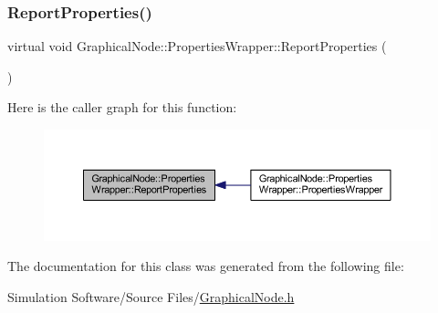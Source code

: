 \subsubsection{\texorpdfstring{Report\+Properties()}{ReportProperties()}}
{\footnotesize\ttfamily virtual void Graphical\+Node\+::\+Properties\+Wrapper\+::\+Report\+Properties (\begin{DoxyParamCaption}{ }\end{DoxyParamCaption})\hspace{0.3cm}{\ttfamily [pure virtual]}}

Here is the caller graph for this function\+:
\nopagebreak
\begin{figure}[H]
\begin{center}
\leavevmode
\includegraphics[width=350pt]{class_graphical_node_1_1_properties_wrapper_a5283fccb2fe983af81f955509294d017_icgraph}
\end{center}
\end{figure}


The documentation for this class was generated from the following file\+:\begin{DoxyCompactItemize}
\item 
Simulation Software/\+Source Files/\hyperlink{_graphical_node_8h}{Graphical\+Node.\+h}\end{DoxyCompactItemize}
